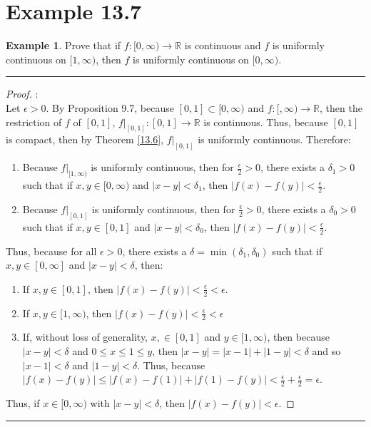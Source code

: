\documentclass[openany, amssymb, psamsfonts]{amsart}
\newcommand{\bbR}{\mathbb{R}}
\theoremstyle{definition}
\newtheorem{exmp}{Example}[section]
\numberwithin{equation}{section}
\begin{document}
\section*{Example 13.7}
\begin{exmp}
\label{13.7}
Prove that if $f: [0,\infty)\to\bbR$ is continuous and $f$ is uniformly continuous on $[1, \infty)$, then $f$ is uniformly continuous on $[0,\infty).$ 
\end{exmp}

\vspace{4pt}     \hrule   \vspace{4pt} \begin{proof}:\\
Let $\epsilon>0$. By Proposition 9.7, because $[0,1]\subset [0, \infty)$ and $f: [,\infty) \to \bbR$, then the restriction of $f$ of $[0,1]$, $f|_{[0,1]}: [0,1] \to \bbR$ is continuous. Thus, because $[0,1]$ is compact, then by Theorem \ref{13.6}, $f|_{[0,1]}$ is uniformly continuous. Therefore:
\begin{enumerate} [1]
    \item Because $f|_{[1,\infty)}$ is uniformly continuous, then for $\frac{\epsilon}{2} > 0$, there exists a $\delta_1>0$ such that if $x,y\in [0,\infty)$ and $|x-y|<\delta_1$, then $|f(x) - f(y)|<\frac{\epsilon}{2}$.
    \item Because $f|_{[0,1]}$ is uniformly continuous, then for $\frac{\epsilon}{2} > 0$, there exists a $\delta_0>0$ such that if $x,y\in [0,1]$ and $|x-y|<\delta_0$, then $|f(x) - f(y)|<\frac{\epsilon}{2}$.
\end{enumerate}
Thus, because for all $\epsilon>0$, there exists a $\delta = \min(\delta_1, \delta_0)$ such that if $x,y \in [0,\infty]$ and $|x-y|<\delta$, then:
\begin{enumerate}
    \item If $x,y\in [0,1]$, then $|f(x) - f(y)|<\frac{\epsilon}{2}<\epsilon$.
    \item If $x,y \in [1,\infty)$, then $|f(x) - f(y)|< \frac{\epsilon}{2}<\epsilon$
    \item If, without loss of generality, $x,\in [0,1]$ and $y\in [1, \infty)$, then because $|x-y|<\delta$ and $0\leq x\leq 1\leq y$, then $|x-y|= |x-1| + |1-y|<\delta$ and so $|x-1|<\delta$ and $|1-y|<\delta$. Thus, because $|f(x) - f(y)|\leq |f(x) - f(1)| + |f(1) - f(y)| < \frac{\epsilon}{2} + \frac{\epsilon}{2} = \epsilon$.
\end{enumerate}
Thus, if $x\in [0,\infty)$ with $|x-y|<\delta$, then $|f(x) - f(y)|<\epsilon$.
\end{proof} \vspace{4pt}     \hrule   \vspace{4pt}
\end{document}
